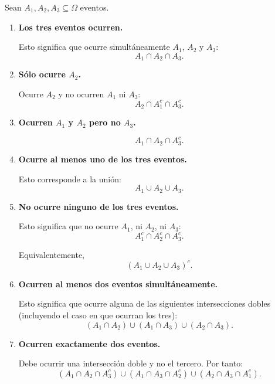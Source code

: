 \documentclass[12pt,a4paper]{article}
\begin{document}
    \begin{solucion}
        Sean $A_1,A_2,A_3\subseteq\Omega$ eventos.
    
        \begin{enumerate}[label=(\alph*)]
    
            \item \textbf{Los tres eventos ocurren.}
    
            Esto significa que ocurre simultáneamente $A_1$, $A_2$ y $A_3$:
            \[
                A_1\cap A_2\cap A_3.
            \]
    
            \item \textbf{Sólo ocurre $A_2$.}
    
            Ocurre $A_2$ y no ocurren $A_1$ ni $A_3$:
            \[
                A_2\cap A_1^c\cap A_3^c.
            \]
    
            \item \textbf{Ocurren $A_1$ y $A_2$ pero no $A_3$.}
    
            \[
                A_1\cap A_2\cap A_3^c.
            \]
    
            \item \textbf{Ocurre al menos uno de los tres eventos.}
    
            Esto corresponde a la unión:
            \[
                A_1\cup A_2\cup A_3.
            \]
    
            \item \textbf{No ocurre ninguno de los tres eventos.}
    
            Esto significa que no ocurre $A_1$, ni $A_2$, ni $A_3$:
            \[
                A_1^c\cap A_2^c\cap A_3^c.
            \]
    
            Equivalentemente,
            \[
                (A_1\cup A_2\cup A_3)^c.
            \]
    
            \item \textbf{Ocurren al menos dos eventos simultáneamente.}
    
            Esto significa que ocurre alguna de las siguientes
            intersecciones dobles (incluyendo el caso en que ocurran los tres):
            \[
                (A_1\cap A_2)
                \cup
                (A_1\cap A_3)
                \cup
                (A_2\cap A_3).
            \]
    
            \item \textbf{Ocurren exactamente dos eventos.}
    
            Debe ocurrir una intersección doble y no el tercero.
            Por tanto:
            \[
                (A_1\cap A_2\cap A_3^c)
                \cup
                (A_1\cap A_3\cap A_2^c)
                \cup
                (A_2\cap A_3\cap A_1^c).
            \]
    
        \end{enumerate}
    \end{solucion}
\end{document}
